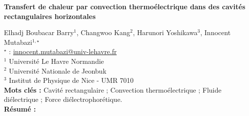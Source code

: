 


    \newpage


%
\begin{flushleft}
\addtocounter{section}{1}
{\Large \textbf{Transfert de chaleur par convection thermoélectrique dans des cavités rectangulaires horizontales}}\label{ref:31}
\end{flushleft}
%
Elhadj Boubacar Barry$^{1}$, Changwoo Kang$^{2}$, Harunori Yoshikawa$^{3}$, Innocent Mutabazi$^{1,\star}$\\[2mm]
$^{\star}$ \Letter : \url{innocent.mutabazi@univ-lehavre.fr}\\[2mm]
{\footnotesize $^{1}$ Université Le Havre Normandie}\\
{\footnotesize $^{2}$ Université Nationale de Jeonbuk}\\
{\footnotesize $^{3}$ Institut de Physique de Nice - UMR 7010}\\
[4mm]
%
\noindent \textbf{Mots clés : } Cavité rectangulaire ; Convection thermoélectrique ; Fluide diélectrique ; Force diélectrophorétique.\\[4mm]
%
\noindent \textbf{Résumé : } 


